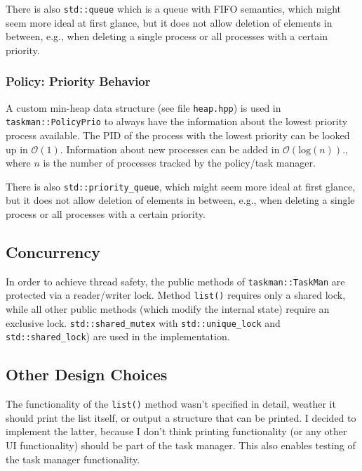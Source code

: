 \documentclass[a4paper]{scrartcl}
\newcommand{\bigo}[1]{\ensuremath{\mathcal{O}\left(#1\right)}}
\begin{document}
There is also \texttt{std::queue} which is a queue with FIFO semantics, which might seem more ideal at first glance, but it does not allow deletion of elements in between, e.g., when deleting a single process or all processes with a certain priority.

\subsubsection{Policy: Priority Behavior}
A custom min-heap data structure (see file \texttt{heap.hpp}) is used in \texttt{taskman::PolicyPrio} to always have the information about the lowest priority process available.
The PID of the process with the lowest priority can be looked up in \bigo{1}. Information about new processes can be added in \bigo{\mathrm{log}(n)}., where $n$ is the number of processes tracked by the policy/task manager.

There is also \texttt{std::priority_queue}, which might seem more ideal at first glance, but it does not allow deletion of elements in between, e.g., when deleting a single process or all processes with a certain priority.

\subsection{Concurrency}
In order to achieve thread safety, the public methods of \texttt{taskman::TaskMan} are protected via a reader/writer lock. Method \texttt{list()} requires only a shared lock, while all other public methods (which modify the internal state) require an exclusive lock. \texttt{std::shared_mutex} with \texttt{std::unique_lock} and \texttt{std::shared_lock}) are used in the implementation.


\subsection{Other Design Choices}

The functionality of the \texttt{list()} method wasn't specified in detail, weather it should print the list itself, or output a structure that can be printed.
I decided to implement the latter, because I don't think printing functionality (or any other UI functionality) should be part of the task manager.
This also enables testing of the task manager functionality.


\end{document}
